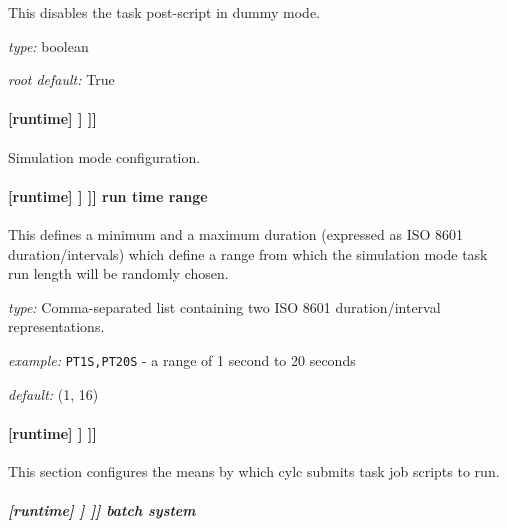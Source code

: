 This disables the task post-script in dummy mode.

\begin{myitemize}
\item {\em type:} boolean
\item {\em root default:} True
\end{myitemize}

\paragraph[{[[[}simulation mode{]]]}]{[runtime] \textrightarrow [[\_\_NAME\_\_]] \textrightarrow [[[simulation mode]]]}

Simulation mode configuration.

\paragraph[run time range]{[runtime] \textrightarrow [[\_\_NAME\_\_]] \textrightarrow [[[simulation mode]]] \textrightarrow run time range}

This defines a minimum and a maximum duration (expressed as ISO 8601
duration/intervals) which define a range from which the simulation mode task
run length will be randomly chosen.

\begin{myitemize}
    \item {\em type:} Comma-separated list containing two ISO 8601
        duration/interval representations.
    \item {\em example:} \lstinline=PT1S,PT20S= - a range of 1 second to 20
    seconds
    \item {\em default:} (1, 16)
\end{myitemize}

\paragraph[{[[[}job{]]]}]{[runtime] \textrightarrow [[\_\_NAME\_\_]] \textrightarrow [[[job]]]}

This section configures the means by which cylc submits task job scripts to run.

\subparagraph[batch system]{[runtime] \textrightarrow [[\_\_NAME\_\_]] \textrightarrow [[[job]]] \textrightarrow batch system}
\label{RuntimeJobSubMethods}


